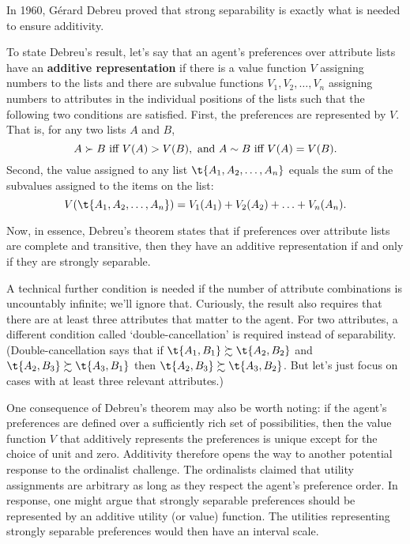 In 1960, G\'erard Debreu proved that strong separability is exactly what is
needed to ensure additivity.

To state Debreu's result, let's say that an agent's preferences over
attribute lists have an \textbf{additive representation} if there is a
value function $V$ assigning numbers to the lists and there are
subvalue functions $V_1, V_2, \ldots, V_n$ assigning numbers to
attributes in the individual positions of the lists such that the
following two conditions are satisfied. First, the preferences are
represented by $V$. That is, for any two lists $A$ and $B$,
\[
  A \succ B \text{ iff } V(A) > V(B), \text{ and }A \sim B \text{ iff }V(A) = V(B).
\]
Second, the value assigned to any list $\t{A_1,A_2,\ldots,A_n}$ equals
the sum of the subvalues assigned to the items on the list:
\[
V(\t{A_1,A_2,\ldots,A_n}) = V_1(A_1) + V_2(A_2) + \ldots + V_n(A_n).
\]

Now, in essence, Debreu's theorem states that if preferences over
attribute lists are complete and transitive, then they have an
additive representation if and only if they are strongly separable.

A technical further condition is needed if the number of attribute
combinations is uncountably infinite; we'll ignore that. Curiously,
the result also requires that there are at least three attributes that
matter to the agent. For two attributes, a different condition called
`double-cancellation' is required instead of
separability. (Double-cancellation says that if $\t{A_1,B_1} \succsim
\t{A_2,B_2}$ and $\t{A_2,B_3} \succsim \t{A_3,B_1}$ then $\t{A_2,B_3}
\succsim \t{A_3,B_2}$. But let's just focus on cases with at least
three relevant attributes.)

One consequence of Debreu's theorem may also be worth noting: if the
agent's preferences are defined over a sufficiently rich set of
possibilities, then the value function $V$ that additively represents
the preferences is unique except for the choice of unit and
zero. Additivity therefore opens the way to another potential response
to the ordinalist challenge. The ordinalists claimed that utility
assignments are arbitrary as long as they respect the agent's
preference order. In response, one might argue that strongly separable
preferences should be represented by an additive utility (or value)
function. The utilities representing strongly separable preferences
would then have an interval scale.


